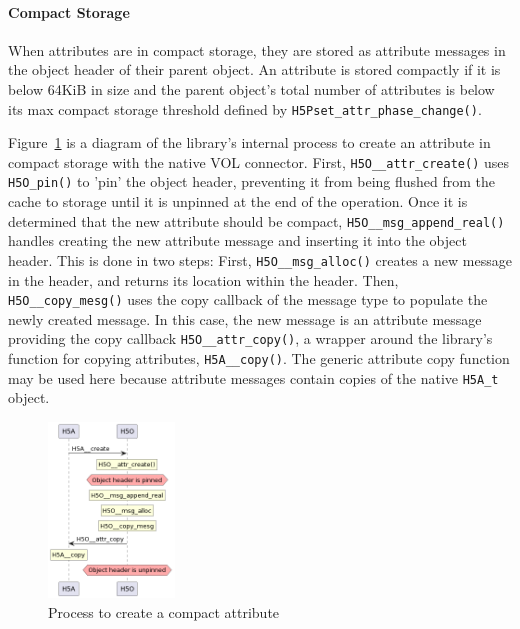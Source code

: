 \paragraph{Compact Storage} When attributes are in compact storage, they are stored as attribute messages in the object header of their parent object. An attribute is stored compactly if it is below 64KiB in size and the parent object's total number of attributes is below its max compact storage threshold defined by \texttt{H5Pset\_attr\_phase\_change()}.

Figure~\ref{fig:tour-3-uml-attr-create-compact} is a diagram of the library's internal process to create an attribute in compact storage with the native VOL connector. First, \texttt{H5O\_\_attr\_create()} uses \texttt{H5O\_pin()} to 'pin' the object header, preventing it from being flushed from the cache to storage until it is unpinned at the end of the operation. Once it is determined that the new attribute should be compact, \texttt{H5O\_\_msg\_append\_real()} handles creating the new attribute message and inserting it into the object header. This is done in two steps: First, \texttt{H5O\_\_msg\_alloc()} creates a new message in the header, and returns its location within the header. Then, \texttt{H5O\_\_copy\_mesg()} uses the copy callback of the message type to populate the newly created message. In this case, the new message is an attribute message providing the copy callback \texttt{H5O\_\_attr\_copy()}, a wrapper around the library's function for copying attributes, \texttt{H5A\_\_copy()}. The generic attribute copy function may be used here because attribute messages contain copies of the native \texttt{H5A\_t} object.

\begin{figure}
    \centering
    \includegraphics[width=0.30\textwidth]{images/tour_3_uml_attr_create_compact.png}
    \caption{Process to create a compact attribute}
    \label{fig:tour-3-uml-attr-create-compact}
\end{figure}

